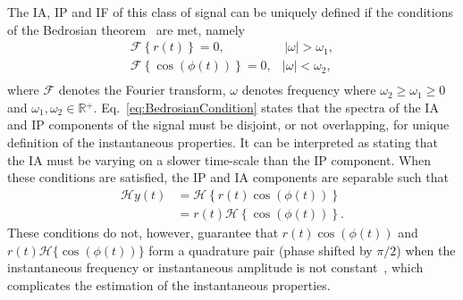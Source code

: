 \documentclass[a4paper]{IEEEtran}
\begin{document}
The IA, IP and IF of this class of signal can be uniquely defined if the conditions of the Bedrosian theorem~\cite{Bedrosian1963} are met, namely
\begin{equation}\label{eq:BedrosianCondition}
\begin{array}{*{20}{c}}
   {\mathcal{F}\left\{ {r\left( t \right)} \right\} = 0,} & {\,\left| \omega \right| > \omega_1,}  \\
   {\mathcal{F}\left\{ {\cos\left(\phi \left( t \right)\right)} \right\} = 0,} & {\left| \omega \right| < \omega_2,}  \\
\end{array}
\end{equation}
where $\mathcal{F}$ denotes the Fourier transform, $\omega$ denotes frequency where $\omega_2 \ge \omega_1 \ge 0$ and $\omega_1,\omega_2 \in \mathbb{R}{^ + }$. Eq.~\ref{eq:BedrosianCondition} states that the spectra of the IA and IP components of the signal must be disjoint, or not overlapping, for unique definition of the instantaneous properties. It can be interpreted as stating that the IA must be varying on a slower time-scale than the IP component. When these conditions are satisfied, the IP and IA components are separable such that
\begin{align}\label{eq:SepAmpandPhase}
   \mathcal{H}y\left( t \right) &= \mathcal{H}\left\{ {r\left( t \right)\cos \left( {\phi \left( t \right)} \right)} \right\} \nonumber \\
   &= r\left( t \right)\mathcal{H}\left\{ {\cos \left( {\phi \left( t \right)} \right)} \right\}.
\end{align}
These conditions do not, however, guarantee that $r\left(t\right)\cos(\phi(t))$ and $r\left(t\right)\mathcal{H}\{\cos(\phi(t))\}$ form a quadrature pair (phase shifted by $\pi/2$) when the instantaneous frequency or instantaneous amplitude is not constant~\cite{Nuttall1966}, which complicates the estimation of the instantaneous properties. 
\end{document}
